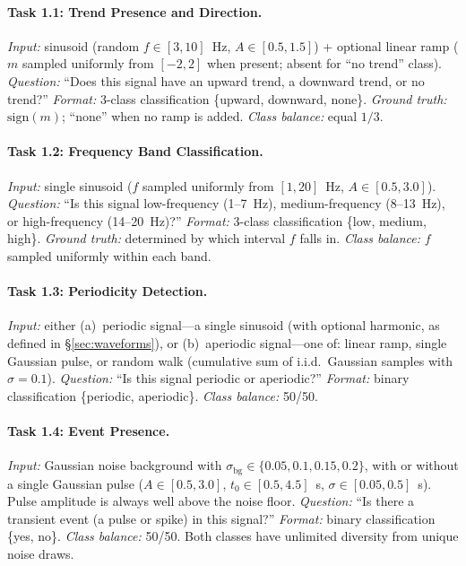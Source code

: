 \documentclass[11pt]{article}
\begin{document}
\paragraph{Task 1.1: Trend Presence and Direction.}
\emph{Input:} sinusoid (random $f \in [3,10]$~Hz, $A \in [0.5,1.5]$) + optional linear ramp ($m$ sampled uniformly from $[-2,2]$ when present; absent for ``no trend'' class).
\emph{Question:} ``Does this signal have an upward trend, a downward trend, or no trend?''
\emph{Format:} 3-class classification \{upward, downward, none\}.
\emph{Ground truth:} $\mathrm{sign}(m)$; ``none'' when no ramp is added.
\emph{Class balance:} equal $1/3$.

\paragraph{Task 1.2: Frequency Band Classification.}
\emph{Input:} single sinusoid ($f$ sampled uniformly from $[1,20]$~Hz, $A \in [0.5,3.0]$).
\emph{Question:} ``Is this signal low-frequency (1--7~Hz), medium-frequency (8--13~Hz), or high-frequency (14--20~Hz)?''
\emph{Format:} 3-class classification \{low, medium, high\}.
\emph{Ground truth:} determined by which interval $f$ falls in.
\emph{Class balance:} $f$ sampled uniformly within each band.

\paragraph{Task 1.3: Periodicity Detection.}
\emph{Input:} either (a)~periodic signal---a single sinusoid (with optional harmonic, as defined in \S\ref{sec:waveforms}), or (b)~aperiodic signal---one of: linear ramp, single Gaussian pulse, or random walk (cumulative sum of i.i.d.\ Gaussian samples with $\sigma = 0.1$).
\emph{Question:} ``Is this signal periodic or aperiodic?''
\emph{Format:} binary classification \{periodic, aperiodic\}.
\emph{Class balance:} 50/50.

\paragraph{Task 1.4: Event Presence.}
\emph{Input:} Gaussian noise background with $\sigma_\text{bg} \in \{0.05, 0.1, 0.15, 0.2\}$, with or without a single Gaussian pulse ($A \in [0.5, 3.0]$, $t_0 \in [0.5, 4.5]$~s, $\sigma \in [0.05, 0.5]$~s). Pulse amplitude is always well above the noise floor.
\emph{Question:} ``Is there a transient event (a pulse or spike) in this signal?''
\emph{Format:} binary classification \{yes, no\}.
\emph{Class balance:} 50/50. Both classes have unlimited diversity from unique noise draws.
\end{document}
